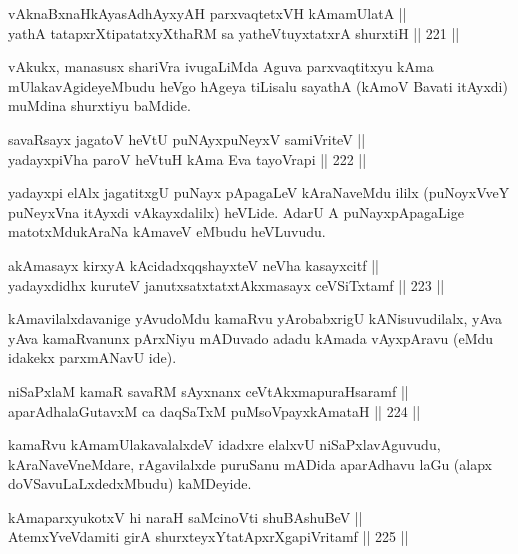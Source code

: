 
\begin{shl}
vAknaBxnaHkAyasAdhAyxyAH parxvaqtetxVH kAmamUlatA || \\
yathA tatapxrXtipatatxyXthaRM sa yatheVtuyxtatxrA shurxtiH ||  221 ||  
\end{shl}

\begin{artha}
vAkukx, manasusx shariVra ivugaLiMda Aguva parxvaqtitxyu kAma
mUlakavAgideyeMbudu heVgo hAgeya tiLisalu sayathA (kAmoV Bavati
itAyxdi) muMdina shurxtiyu baMdide.
\end{artha}

\begin{shl}
savaRsayx jagatoV heVtU puNAyxpuNeyxV samiVriteV || \\
yadayxpiVha paroV heVtuH kAma Eva tayoVrapi ||  222 ||  
\end{shl}

\begin{artha}
yadayxpi elAlx jagatitxgU puNayx pApagaLeV kAraNaveMdu ililx
(puNoyxVveY puNeyxVna itAyxdi vAkayxdalilx) heVLide. AdarU A
puNayxpApagaLige matotxMdukAraNa kAmaveV eMbudu heVLuvudu.
\end{artha}

\begin{shl}
akAmasayx kirxyA kAcidadxqqshayxteV neVha kasayxcitf || \\
yadayxdidhx kuruteV janutxsatxtatxtAkxmasayx ceVSiTxtamf ||  223 ||  
\end{shl}

\begin{artha}
kAmavilalxdavanige yAvudoMdu kamaRvu yArobabxrigU kANisuvudilalx, yAva
yAva kamaRvanunx pArxNiyu mADuvado adadu kAmada vAyxpAravu (eMdu
idakekx parxmANavU ide).
\end{artha}

\begin{shl}
niSaPxlaM kamaR savaRM sAyxnanx ceVtAkxmapuraHsaramf || \\
aparAdhalaGutavxM ca daqSaTxM puMsoV\s payxkAmataH ||  224 ||  
\end{shl}

\begin{artha}
kamaRvu kAma\s mUlakavalalxdeV idadxre elalxvU niSaPxlavAguvudu,
kAraNaveVneMdare, rAgavilalxde puruSanu mADida aparAdhavu laGu (alapx
doVSavuLaLxdedxMbudu) kaMDeyide.
\end{artha}

\begin{shl}
kAmaparxyukotxV hi naraH saMcinoVti shuBAshuBeV || \\
AtemxYveVdamiti girA shurxteyxYtatApxrXgapiVritamf ||  225 ||  
\end{shl}

